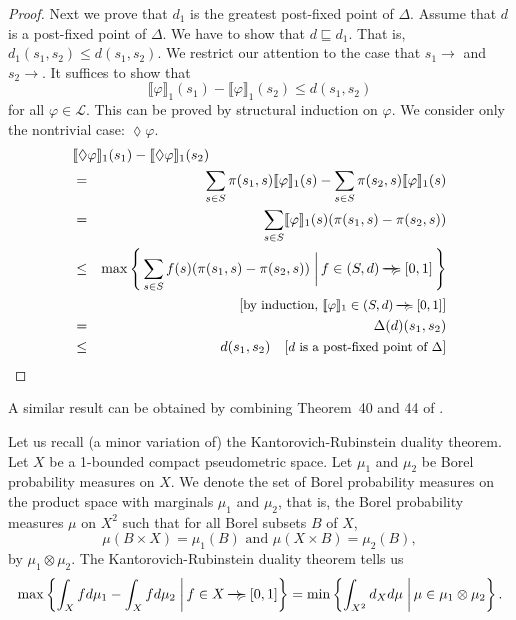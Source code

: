 \documentclass{LMCS}
\newcommand{\ndi}{\mathbin{\raisebox{0.15ex}{-\hspace{-0.2em}-\hspace{-0.2em}-\hspace{-0.2em}-\hspace{-0.2em}-\hspace{-0.2em}-}\hspace{-0.7em}\succcurlyeq}}
\newcommand{\unterpretation}[1]{\llbracket #1 \rrbracket_{1}}
\newcommand{\comment}[1]{\hspace{1em}\mbox{[{\small #1}]}}
\newcommand{\modality}{\lozenge}
\newcommand{\bigmid}{\; \bigg| \,}
\begin{document}
\begin{proof}
Next we prove that $d_1$ is the greatest post-fixed point of $\Delta$.
Assume that $d$ is a post-fixed point of $\Delta$.  We have to show that
$d \sqsubseteq d_1$.  That is, $d_1(s_1, s_2) \leq d(s_1, s_2)$. 
We restrict our attention to the case that
$s_1 \rightarrow$ and $s_2 \rightarrow$.  It suffices to show that
\begin{displaymath}
\unterpretation{\varphi}(s_1) - \unterpretation{\varphi}(s_2) \leq d(s_1, s_2)
\end{displaymath}
for all $\varphi \in \mathcal{L}$.  This can be proved by structural induction on
$\varphi$.  We consider only the nontrivial case: $\modality \varphi$.
\begin{eqnarray*}
\lefteqn{\unterpretation{\modality \varphi}(s_1) - \unterpretation{\modality \varphi}(s_2)}\\
& = & \sum_{s \in S} \pi(s_1, s) \unterpretation{\varphi}(s) - \sum_{s \in S} \pi(s_2, s) \unterpretation{\varphi}(s)\\
& = & \sum_{s \in S} \unterpretation{\varphi}(s) (\pi(s_1, s) - \pi(s_2, s))\\
& \leq & \max \left \{\, \sum_{s \in S} f(s) (\pi(s_1, s) - \pi(s_2, s)) \bigmid f \in (S, d) \ndi [0, 1] \, \right \}\\
&& \comment{by induction, $\unterpretation{\varphi} \in (S, d) \ndi [0, 1]$}\\
& = & \Delta(d)(s_1, s_2)\\
& \leq & d(s_1, s_2)
\comment{$d$ is a post-fixed point of $\Delta$}
\end{eqnarray*}
\end{proof}

A similar result can be obtained by combining Theorem~40 and 44 of \cite{BHMW06:tcs}.

Let us recall (a minor variation of) the Kantorovich-Rubinstein duality theorem.  Let $X$ be a 
1-bounded compact pseudometric space.  Let $\mu_1$ and $\mu_2$ be Borel probability measures on $X$.  
We denote the set of Borel probability measures on the product space with marginals 
$\mu_1$ and $\mu_2$, that is, the Borel probability measures $\mu$ on $X^2$ such that 
for all Borel subsets $B$ of $X$,
\begin{displaymath}
\mu(B \times X) = \mu_1(B) \mbox{ and } \mu(X \times B) = \mu_2(B),
\end{displaymath}
by $\mu_1 \otimes \mu_2$.  The Kantorovich-Rubinstein duality theorem tells us
\begin{displaymath}
\max \left \{ \int_X f d\mu_1 - \int_X f d\mu_2 \bigmid f \in X \ndi [0, 1]  \right\}
=
\min \left \{ \int_{X^2} d_X d\mu \bigmid \mu \in \mu_1 \otimes \mu_2  \right\}.
\end{displaymath}
\end{document}

